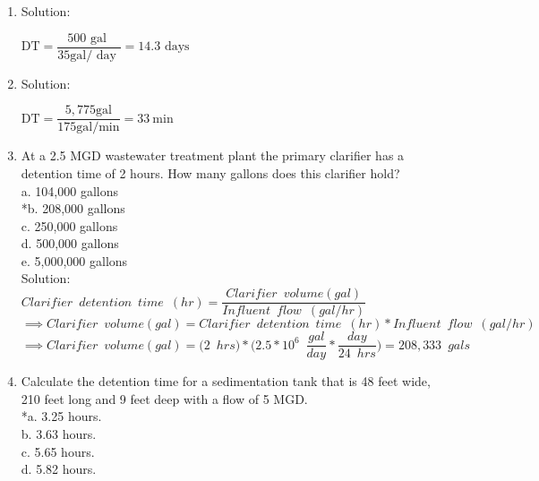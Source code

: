 \documentclass{article}
\begin{document}
\begin{enumerate}
\item Solution:\\

\vspace{0.4cm}

$
\mathrm{DT}=\dfrac{500 \text { gal }}{35 \mathrm{gal} / \text { day }}=14.3 \text { days }
$
\vspace{0.4cm}

\item Solution:\\

\vspace{0.4cm}

$
\mathrm{DT}=\dfrac{5,775 \mathrm{gal}}{175 \mathrm{gal} / \mathrm{min}}=33 \mathrm{~min}
$

\item  At a 2.5 MGD wastewater treatment plant the primary clarifier has a detention time of 2 hours. How many gallons does this clarifier hold?\\

a. 104,000 gallons \\
*b. 208,000 gallons \\
c. 250,000 gallons \\
d. 500,000 gallons \\
e. 5,000,000 gallons \\

\vspace{0.5cm}
Solution:\\
\vspace{0.2cm}
$Clarifier \enspace detention \enspace time \enspace (hr) = 	\dfrac{ Clarifier \enspace volume (gal)}{Influent \enspace flow \enspace (gal/hr)}$\\
\vspace{0.2cm}
$ \implies Clarifier \enspace volume (gal)=Clarifier \enspace detention \enspace time \enspace (hr)*Influent \enspace flow \enspace (gal/hr)$\\
\vspace{0.2cm}
$ \implies Clarifier \enspace volume (gal)= \Big(2 \enspace hrs\Big)*\Big(2.5*10^6 \enspace \dfrac{gal}{day}*\dfrac{day}{24 \enspace hrs}\Big)=\boxed{208,333 \enspace gals}$\\


\item Calculate the detention time for a sedimentation tank that is 48 feet wide, 210 feet long and 9 feet deep with a flow of 5 MGD.\\

\vspace{0.5cm}
*a. 3.25 hours. \\
b. 3.63 hours. \\
c. 5.65 hours. \\
d. 5.82 hours. \\


\end{enumerate}
\end{document}
